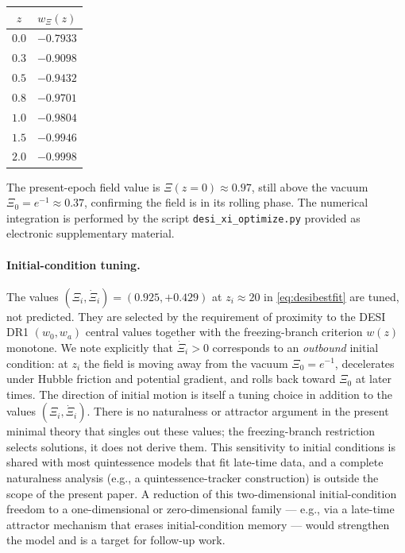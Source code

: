 \documentclass[11pt,reqno]{amsart}
\theoremstyle{plain}
\theoremstyle{definition}
\theoremstyle{remark}
\begin{document}
\begin{center}
\begin{tabular}{c|c}
$z$ & $w_\Xi(z)$\\
\hline
$0.0$ & $-0.7933$\\
$0.3$ & $-0.9098$\\
$0.5$ & $-0.9432$\\
$0.8$ & $-0.9701$\\
$1.0$ & $-0.9804$\\
$1.5$ & $-0.9946$\\
$2.0$ & $-0.9998$
\end{tabular}
\end{center}

The present-epoch field value is $\Xi(z=0) \approx 0.97$, still above
the vacuum $\Xi_0 = e^{-1} \approx 0.37$, confirming the field is in
its rolling phase. The numerical integration is performed by the
script \texttt{desi\_xi\_optimize.py} provided as electronic
supplementary material.

\paragraph{Initial-condition tuning.}
The values $(\Xi_i, \dot\Xi_i) = (0.925, +0.429)$ at $z_i \approx 20$ in
\eqref{eq:desibestfit} are tuned, not predicted. They are selected by
the requirement of proximity to the DESI DR1 $(w_0, w_a)$ central values
together with the freezing-branch criterion $w(z)$ monotone. We note
explicitly that $\dot\Xi_i > 0$ corresponds to an \emph{outbound}
initial condition: at $z_i$ the field is moving away from the
vacuum $\Xi_0 = e^{-1}$, decelerates under Hubble friction and
potential gradient, and rolls back toward $\Xi_0$ at later times. The
direction of initial motion is itself a tuning choice in addition to
the values $(\Xi_i, \dot\Xi_i)$. There is
no naturalness or attractor argument in the present minimal theory
that singles out these values; the freezing-branch restriction selects
solutions, it does not derive them. This sensitivity to initial
conditions is shared with most quintessence models that fit
late-time data, and a complete naturalness analysis (e.g., a
quintessence-tracker construction) is outside the scope of the present
paper. A reduction of this two-dimensional initial-condition freedom
to a one-dimensional or zero-dimensional family --- e.g., via a
late-time attractor mechanism that erases initial-condition memory ---
would strengthen the model and is a target for follow-up work.
\end{document}
